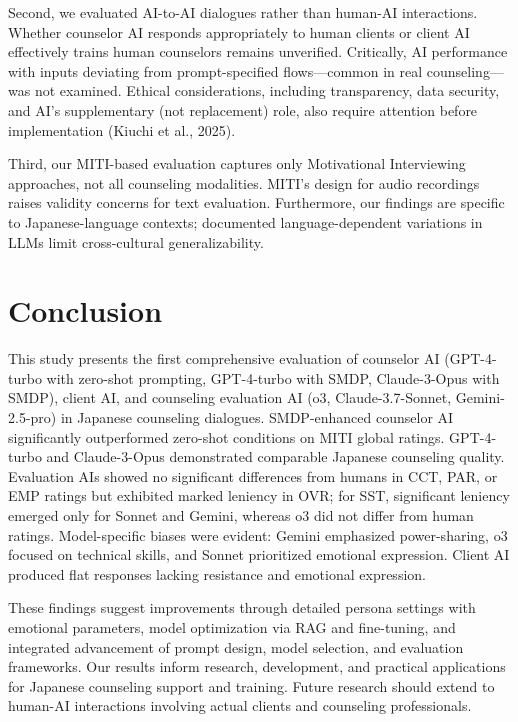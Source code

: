 \documentclass{wiley-article}
\begin{document}
Second, we evaluated AI-to-AI dialogues rather than human-AI interactions. Whether counselor AI responds appropriately to human clients or client AI effectively trains human counselors remains unverified. Critically, AI performance with inputs deviating from prompt-specified flows—common in real counseling—was not examined. Ethical considerations, including transparency, data security, and AI’s supplementary (not replacement) role, also require attention before implementation (Kiuchi et al., 2025).

Third, our MITI-based evaluation captures only Motivational Interviewing approaches, not all counseling modalities. MITI’s design for audio recordings raises validity concerns for text evaluation. Furthermore, our findings are specific to Japanese-language contexts; documented language-dependent variations in LLMs limit cross-cultural generalizability.





\section*{Conclusion}

This study presents the first comprehensive evaluation of counselor AI (GPT-4-turbo with zero-shot prompting, GPT-4-turbo with SMDP, Claude-3-Opus with SMDP), client AI, and counseling evaluation AI (o3, Claude-3.7-Sonnet, Gemini-2.5-pro) in Japanese counseling dialogues. SMDP-enhanced counselor AI significantly outperformed zero-shot conditions on MITI global ratings. GPT-4-turbo and Claude-3-Opus demonstrated comparable Japanese counseling quality. Evaluation AIs showed no significant differences from humans in CCT, PAR, or EMP ratings but exhibited marked leniency in OVR; for SST, significant leniency emerged only for Sonnet and Gemini, whereas o3 did not differ from human ratings. Model-specific biases were evident: Gemini emphasized power-sharing, o3 focused on technical skills, and Sonnet prioritized emotional expression. Client AI produced flat responses lacking resistance and emotional expression.

These findings suggest improvements through detailed persona settings with emotional parameters, model optimization via RAG and fine-tuning, and integrated advancement of prompt design, model selection, and evaluation frameworks. Our results inform research, development, and practical applications for Japanese counseling support and training. Future research should extend to human-AI interactions involving actual clients and counseling professionals.
\end{document}
